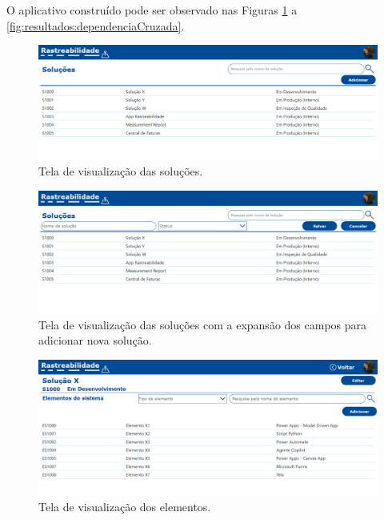 	O aplicativo construído pode ser observado nas Figuras \ref{fig:resultados:solucoes} a \ref{fig:resultados:dependenciaCruzada}.

	\begin{figure}[!h]
		\centering
		\includegraphics[width=1\textwidth]{./figuras/solucoes.png}
		\caption{Tela de visualização das soluções.}
		\label{fig:resultados:solucoes}
	\end{figure}

	\begin{figure}[!h]
		\centering
		\includegraphics[width=1\textwidth]{./figuras/solucoesAdicionar.png}
		\caption{Tela de visualização das soluções com a expansão dos campos para adicionar nova solução.}
		\label{fig:resultados:solucoesAdicionar}
	\end{figure}

	\begin{figure}[!h]
		\centering
		\includegraphics[width=1\textwidth]{./figuras/solucaoElementos.png}
		\caption{Tela de visualização dos elementos.}
		\label{fig:resultados:solucaoElementos}
	\end{figure}

